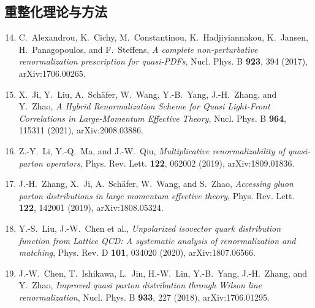 \documentclass[11pt,a4paper]{ctexart}
\begin{document}
\subsection*{重整化理论与方法}
\begin{enumerate}\setcounter{enumi}{13}
  \item C.~Alexandrou, K.~Cichy, M.~Constantinou, K.~Hadjiyiannakou, K.~Jansen, H.~Panagopoulos, and F.~Steffens, \textit{A complete non-perturbative renormalization prescription for quasi-PDFs}, Nucl. Phys. B \textbf{923}, 394 (2017), arXiv:1706.00265.
  \item X.~Ji, Y.~Liu, A.~Sch\"afer, W.~Wang, Y.-B.~Yang, J.-H.~Zhang, and Y.~Zhao, \textit{A Hybrid Renormalization Scheme for Quasi Light-Front Correlations in Large-Momentum Effective Theory}, Nucl. Phys. B \textbf{964}, 115311 (2021), arXiv:2008.03886.
  \item Z.-Y.~Li, Y.-Q.~Ma, and J.-W.~Qiu, \textit{Multiplicative renormalizability of quasi-parton operators}, Phys. Rev. Lett. \textbf{122}, 062002 (2019), arXiv:1809.01836.
  \item J.-H.~Zhang, X.~Ji, A.~Sch\"afer, W.~Wang, and S.~Zhao, \textit{Accessing gluon parton distributions in large momentum effective theory}, Phys. Rev. Lett. \textbf{122}, 142001 (2019), arXiv:1808.05324.
  \item Y.-S.~Liu, J.-W.~Chen et al., \textit{Unpolarized isovector quark distribution function from Lattice QCD: A systematic analysis of renormalization and matching}, Phys. Rev. D \textbf{101}, 034020 (2020), arXiv:1807.06566.
  \item J.-W.~Chen, T.~Ishikawa, L.~Jin, H.-W.~Lin, Y.-B.~Yang, J.-H.~Zhang, and Y.~Zhao, \textit{Improved quasi parton distribution through Wilson line renormalization}, Nucl. Phys. B \textbf{933}, 227 (2018), arXiv:1706.01295.
\end{enumerate}
\end{document}

